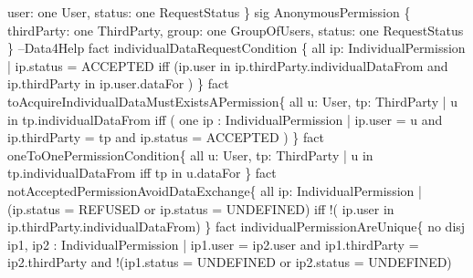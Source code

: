 \documentclass[a4paper]{article}
\begin{document}
{\newline user: one User,
\newline status: one RequestStatus
\newline \}
\newline 
\newline sig AnonymousPermission \{
\newline thirdParty: one ThirdParty,
\newline group: one GroupOfUsers,
\newline status: one  RequestStatus
\newline \}
\newline 
\newline --Data4Help
\newline 
\newline fact individualDataRequestCondition \{
\newline all ip: IndividualPermission | ip.status = ACCEPTED iff 
\newline (ip.user in ip.thirdParty.individualDataFrom and 
\newline ip.thirdParty in ip.user.dataFor )
\newline \}
\newline 
\newline fact toAcquireIndividualDataMustExistsAPermission\{
\newline all u: User, tp: ThirdParty | u in tp.individualDataFrom iff 
\newline ( one ip : IndividualPermission | ip.user = u and 
\newline ip.thirdParty = tp and ip.status = ACCEPTED )
\newline \}
\newline 
\newline fact oneToOnePermissionCondition\{
\newline 	all u: User, tp: ThirdParty | u in tp.individualDataFrom iff tp in u.dataFor
\newline \}
\newline 
\newline fact notAcceptedPermissionAvoidDataExchange\{
\newline all ip: IndividualPermission | (ip.status = REFUSED or ip.status = UNDEFINED) iff !( ip.user in ip.thirdParty.individualDataFrom)
\newline \}
\newline 
\newline fact individualPermissionAreUnique\{
\newline no disj ip1, ip2 : IndividualPermission |  ip1.user = ip2.user and  ip1.thirdParty = ip2.thirdParty and !(ip1.status = UNDEFINED or ip2.status = UNDEFINED)
}
\end{document}
